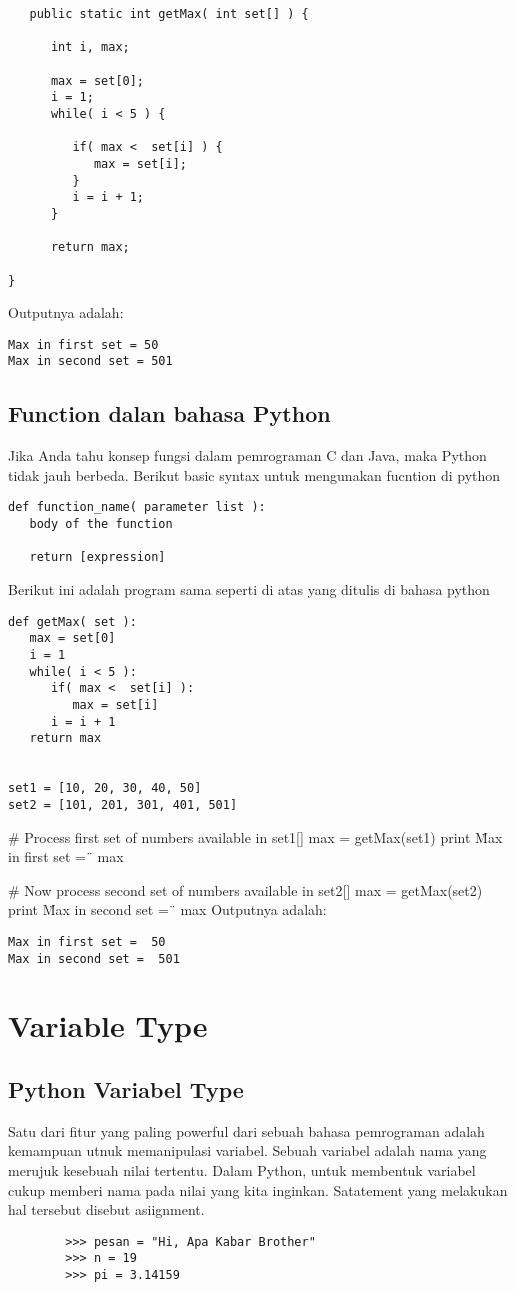 \begin {verbatim}
   public static int getMax( int set[] ) {
  
      int i, max;
    
      max = set[0];
      i = 1;    
      while( i < 5 ) {
 
         if( max <  set[i] ) {
            max = set[i];
         }
         i = i + 1;
      }
     
      return max;
   
}
\end {verbatim}
Outputnya adalah: 
\begin {verbatim}
Max in first set = 50
Max in second set = 501
\end {verbatim}

\subsection {Function dalan bahasa Python}
Jika Anda tahu konsep fungsi dalam pemrograman C dan Java, maka Python tidak jauh berbeda. Berikut basic syntax untuk mengunakan fucntion di python 

\begin {verbatim}
def function_name( parameter list ):
   body of the function
   
   return [expression]
\end {verbatim}
Berikut ini adalah program sama seperti di atas yang ditulis di bahasa python 
\begin {verbatim}
def getMax( set ):
   max = set[0]
   i = 1  
   while( i < 5 ):
      if( max <  set[i] ):
         max = set[i]
      i = i + 1
   return max
 
 
set1 = [10, 20, 30, 40, 50]
set2 = [101, 201, 301, 401, 501]
\end {verbatim}
 
# Process first set of numbers available in set1[]
max = getMax(set1)
print \"Max in first set = \"\, max
     
# Now process second set of numbers available in set2[]
max = getMax(set2)
print \"Max in second set = \"\, max
Outputnya adalah: 
\begin {verbatim}
Max in first set =  50
Max in second set =  501
\end {verbatim}

\section{Variable Type}
\subsection{Python Variabel Type}
Satu dari fitur yang paling powerful dari sebuah bahasa pemrograman adalah kemampuan utnuk memanipulasi variabel. Sebuah variabel adalah nama yang merujuk kesebuah nilai tertentu. Dalam Python, untuk membentuk variabel cukup memberi nama pada nilai yang kita inginkan. Satatement yang melakukan hal tersebut disebut asiignment.
    \begin{verbatim}
        >>> pesan = "Hi, Apa Kabar Brother"
        >>> n = 19
        >>> pi = 3.14159
     \end{verbatim}
